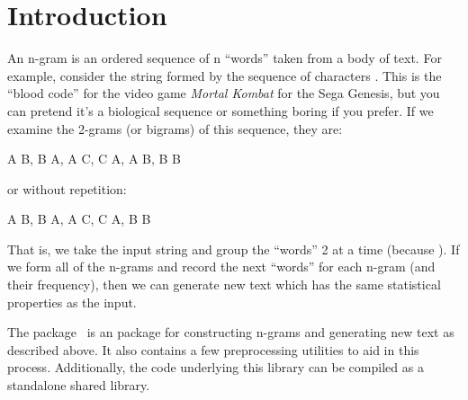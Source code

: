 \section{Introduction}
\label{sec:intro}

An n-gram is an ordered sequence of n ``words'' taken from a body of
text.  For example, consider the string formed by the sequence of characters
. This is the ``blood code'' for the video game 
\emph{Mortal Kombat} for the Sega Genesis, but you 
can pretend it's a biological sequence or something boring if you prefer.  If we
examine the 2-grams (or bigrams) of this sequence, they are:
\\
\begin{Code}
A B, B A, A C, C A, A B, B B
\end{Code}
or without repetition:
\\
\begin{Code}
A B, B A, A C, C A, B B
\end{Code}

That is, we take the input string and group the ``words'' 2 at a time (because 
).  If we form all of the n-grams and record the next ``words'' for 
each n-gram (and their frequency), then we can generate new text which has the 
same statistical properties as the input.

The \thispackage package~\citep{ngram} is an \R package for constructing n-grams
and generating new text as described above.  It also contains a few 
preprocessing utilities to aid in this process.  Additionally, the \C code 
underlying this library can be compiled as a standalone shared library.